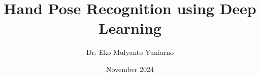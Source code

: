 \documentclass[a4paper,12pt]{book}
\begin{document}
\author{Dr. Eko Mulyanto Yuniarno}
\title{Hand Pose Recognition using Deep Learning}
\date{November 2024}

\frontmatter
\maketitle
\tableofcontents

\mainmatter





\backmatter
\end{document}
